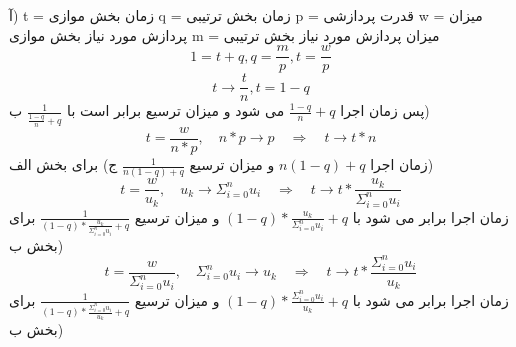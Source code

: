آ)\newline
t = زمان بخش موازی
\newline
q = زمان بخش ترتیبی
\newline
p = قدرت پردازشی
\newline
w = میزان پردازش مورد نیاز بخش موازی
\newline
m = میزان پردازش مورد نیاز بخش ترتیبی
\newline
\begin{equation*}
    1 = t + q, q = \frac{m}{p}, t = \frac{w}{p}
    \end{equation*}
    \begin{equation*}
    t \rightarrow \frac{t}{n}, t = 1 - q
\end{equation*}
پس زمان اجرا 
$\frac{1-q}{n} + q$
می شود و میزان ترسیع برابر است با
$\frac{1}{\frac{1-q}{n} + q}$
\newline
ب)\newline
\begin{equation*}
    t = \frac{w}{n*p},\quad n*p \rightarrow p \quad \Rightarrow \quad t \rightarrow t*n
\end{equation*}
زمان اجرا 
$n(1-q) + q$
و میزان ترسیع
$\frac{1}{n(1-q) + q}$
\newline
ج)\newline
برای بخش الف)
\begin{equation*}
    t = \frac{w}{u_k},\quad u_k \rightarrow \Sigma_{i=0}^nu_i \quad \Rightarrow \quad t \rightarrow t * \frac{u_k}{\Sigma_{i=0}^nu_i}
\end{equation*}
زمان اجرا برابر می شود با
$(1-q)*\frac{u_k}{\Sigma_{i=0}^nu_i} + q$
و میزان ترسیع
$\frac{1}{(1-q)*\frac{u_k}{\Sigma_{i=0}^nu_i} + q}$
\newline
برای بخش ب)
\begin{equation*}
    t = \frac{w}{\Sigma_{i=0}^nu_i},\quad \Sigma_{i=0}^nu_i \rightarrow u_k \quad \Rightarrow \quad t \rightarrow t * \frac{\Sigma_{i=0}^nu_i}{u_k}
\end{equation*}
زمان اجرا برابر می شود با
$(1-q)*\frac{\Sigma_{i=0}^nu_i}{u_k} + q$
و میزان ترسیع
$\frac{1}{(1-q)*\frac{\Sigma_{i=0}^nu_i}{u_k} + q}$
برای بخش ب)
